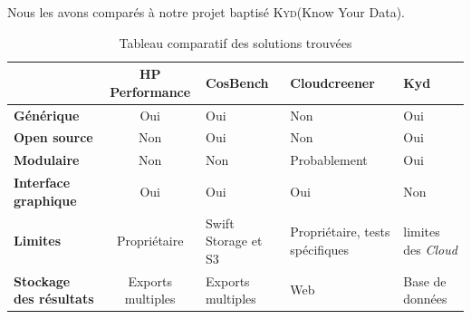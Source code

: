 \documentclass[10pt]{article}
\newcommand{\KYD}{\textsc{Kyd}\xspace}
\begin{document}
Nous les avons comparés à notre projet baptisé \KYD (Know Your Data).



\begin{table}[h] \caption{Tableau comparatif des solutions trouvées}
\renewcommand{\arraystretch}{1.5} \begin{center}
\begin{tabular}{|p{2cm}|c|p{2cm}|p{3cm}|p{2cm}|} \hline & \bf HP Performance &
\bf CosBench & \bf Cloudcreener & \bf Kyd  \\ \hline \bf\centering Générique &
Oui & Oui & Non & Oui \\ \hline \bf\centering Open source & Non & Oui & Non &
Oui \\ \hline \bf\centering Modulaire & Non & Non & Probablement & Oui \\ \hline
\bf\centering Interface graphique & Oui & Oui & Oui & Non \\ \hline
\bf\centering Limites & Propriétaire & Swift Storage et S3 & Propriétaire, tests
spécifiques & limites des \textit{Cloud} \\ \hline \bf\centering Stockage des
résultats & Exports multiples & Exports multiples & Web & Base de données \\
\hline \end{tabular} \end{center} \end{table}
\end{document}
